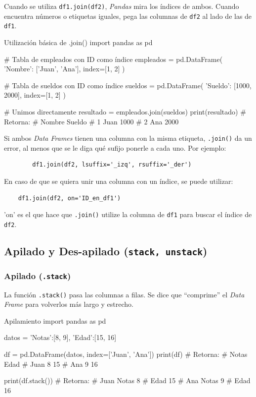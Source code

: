 Cuando se utiliza \texttt{df1.join(df2)}, \textit{Pandas} mira los índices de ambos. Cuando encuentra números o etiquetas iguales, pega las columnas de \texttt{df2} al lado de las de \texttt{df1}.

\begin{pycode}{Utilización básica de .join()}
import pandas as pd

# Tabla de empleados con ID como índice
empleados = pd.DataFrame({
    'Nombre': ['Juan', 'Ana']}, 
    index=[1, 2]
)

# Tabla de sueldos con ID como índice
sueldos = pd.DataFrame({
    'Sueldo': [1000, 2000]}, 
    index=[1, 2]
)

# Unimos directamente
resultado = empleados.join(sueldos)
print(resultado) # Retorna:
#   Nombre  Sueldo
# 1   Juan    1000
# 2    Ana    2000 
\end{pycode}

\begin{nota}
    Si ambos \textit{Data Frames} tienen una columna con la misma etiqueta, \texttt{.join()} da un error, al menos que se le diga qué sufijo ponerle a cada uno. Por ejemplo:
    \begin{verbatim}
        df1.join(df2, lsuffix='_izq', rsuffix='_der')
    \end{verbatim}
\end{nota}


En caso de que se quiera unir una columna con un índice, se puede utilizar:
\begin{verbatim}
    df1.join(df2, on='ID_en_df1') 
\end{verbatim}
'on' es el que hace que \texttt{.join()} utilize la columna de \texttt{df1} para buscar el índice de \texttt{df2}.





\subsection{Apilado y Des-apilado (\texttt{stack, unstack})}

\subsubsection{Apilado (\texttt{.stack})}

La función \texttt{.stack()} pasa las columnas a filas. Se dice que ``comprime'' el \textit{Data Frame} para volverlos más largo y estrecho.

\begin{pycode}{Apilamiento}
import pandas as pd

datos = {
    'Notas':[8, 9],
    'Edad':[15, 16]
}

df = pd.DataFrame(datos, index=['Juan', 'Ana'])
print(df) # Retorna:
#       Notas  Edad
# Juan      8    15
# Ana       9    16

print(df.stack()) # Retorna:
# Juan  Notas     8
#       Edad     15
# Ana   Notas     9
#       Edad     16    
\end{pycode}

